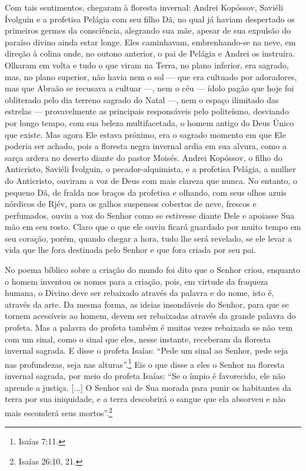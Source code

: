 Com tais sentimentos, chegaram à floresta invernal: Andrei Kopóssov,
Saviéli Ívolguin e a profetisa Pelágia com seu filho Dã, no qual já
haviam despertado os primeiros germes da consciência, alegrando sua mãe,
apesar de sua expulsão do paraíso divino ainda estar longe. Eles
caminhavam, embrenhando-se na neve, em direção à colina onde, no outono
anterior, o pai de Pelágia e Andrei os instruíra. Olharam em volta e
tudo o que viram na Terra, no plano inferior, era sagrado, mas, no plano
superior, não havia nem o sol --- que era cultuado por adoradores, mas
que Abraão se recusava a cultuar ---, nem o céu --- ídolo pagão que hoje
foi obliterado pelo dia terreno sagrado do Natal ---, nem o espaço
ilimitado das estrelas --- provavelmente as principais responsáveis pelo
politeísmo, desviando por longo tempo, com sua beleza multifacetada, o
homem antigo do Deus Único que existe. Mas agora Ele estava próximo, era
o sagrado momento em que Ele poderia ser achado, pois a floresta negra
invernal ardia em sua alvura, como a sarça ardera no deserto diante do
pastor Moisés. Andrei Kopóssov, o filho do Anticristo, Saviéli Ívolguin,
o pecador-alquimista, e a profetisa Pelágia, a mulher do Anticristo,
ouviram a voz de Deus com mais clareza que nunca. No entanto, o pequeno
Dã, de fralda nos braços da profetisa e olhando, com seus olhos azuis
nórdicos de Rjév, para os galhos suspensos cobertos de neve, frescos e
perfumados, ouviu a voz do Senhor como se estivesse diante Dele e
apoiasse Sua mão em seu rosto. Claro que o que ele ouviu ficará guardado
por muito tempo em seu coração, porém, quando chegar a hora, tudo lhe
será revelado, se ele levar a vida que lhe fora destinada pelo Senhor e
que fora criada por seu pai.

No poema bíblico sobre a criação do mundo foi dito que o Senhor criou,
enquanto o homem inventou os nomes para a criação, pois, em virtude da
fraqueza humana, o Divino deve ser rebaixado através da palavra e do
nome, isto é, através da arte. Da mesma forma, as ideias insondáveis do
Senhor, para que se tornem acessíveis ao homem, devem ser rebaixadas
através da grande palavra do profeta. Mas a palavra do profeta também é
muitas vezes rebaixada se não vem com um sinal, como o sinal que eles,
nesse instante, receberam da floresta invernal sagrada. E disse o
profeta Isaías: ``Pede um sinal ao Senhor, pede seja nas profundezas,
seja nas alturas''.\footnote{Isaías 7:11.} Eis o que disse a eles o
Senhor na floresta invernal sagrada, por meio do profeta Isaías: ``Se o
ímpio é favorecido, ele não aprende a justiça. {[}...{]} O Senhor sai de
Sua morada para punir os habitantes da terra por sua iniquidade, e a
terra descobrirá o sangue que ela absorveu e não mais esconderá seus
mortos''.\footnote{Isaías 26:10, 21.}

